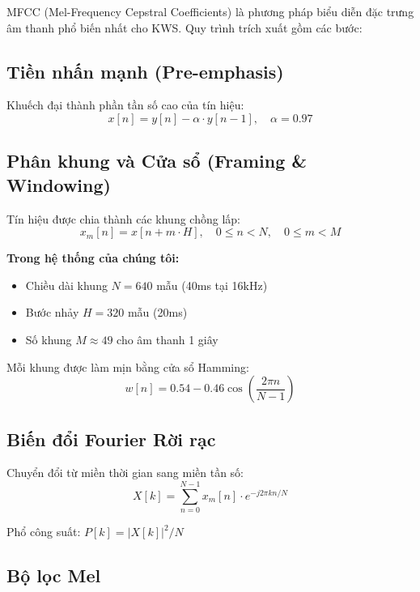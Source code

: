 \documentclass[12pt,a4paper]{report}
\begin{document}
MFCC (Mel-Frequency Cepstral Coefficients) là phương pháp biểu diễn đặc trưng
âm thanh phổ biến nhất cho KWS. Quy trình trích xuất gồm các bước:

\subsection{Tiền nhấn mạnh (Pre-emphasis)}

Khuếch đại thành phần tần số cao của tín hiệu:
\begin{equation}
    x[n] = y[n] - \alpha \cdot y[n-1], \quad \alpha = 0.97
\end{equation}

\subsection{Phân khung và Cửa sổ (Framing \& Windowing)}

Tín hiệu được chia thành các khung chồng lấp:
\begin{equation}
    x_m[n] = x[n + m \cdot H], \quad 0 \leq n < N, \quad 0 \leq m < M
\end{equation}

\textbf{Trong hệ thống của chúng tôi:}
\begin{itemize}
    \item Chiều dài khung $N = 640$ mẫu (40ms tại 16kHz)
    \item Bước nhảy $H = 320$ mẫu (20ms)
    \item Số khung $M \approx 49$ cho âm thanh 1 giây
\end{itemize}

Mỗi khung được làm mịn bằng cửa sổ Hamming:
\begin{equation}
    w[n] = 0.54 - 0.46 \cos\left(\frac{2\pi n}{N-1}\right)
\end{equation}

\subsection{Biến đổi Fourier Rời rạc}

Chuyển đổi từ miền thời gian sang miền tần số:
\begin{equation}
    X[k] = \sum_{n=0}^{N-1} x_m[n] \cdot e^{-j2\pi kn/N}
\end{equation}

Phổ công suất: $P[k] = |X[k]|^2 / N$

\subsection{Bộ lọc Mel}
\end{document}
